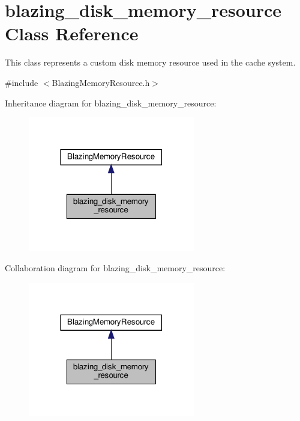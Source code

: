 \hypertarget{classblazing__disk__memory__resource}{}\section{blazing\+\_\+disk\+\_\+memory\+\_\+resource Class Reference}
\label{classblazing__disk__memory__resource}


This class represents a custom disk memory resource used in the cache system.  




{\ttfamily \#include $<$Blazing\+Memory\+Resource.\+h$>$}



Inheritance diagram for blazing\+\_\+disk\+\_\+memory\+\_\+resource\+:\nopagebreak
\begin{figure}[H]
\begin{center}
\leavevmode
\includegraphics[width=206pt]{classblazing__disk__memory__resource__inherit__graph}
\end{center}
\end{figure}


Collaboration diagram for blazing\+\_\+disk\+\_\+memory\+\_\+resource\+:\nopagebreak
\begin{figure}[H]
\begin{center}
\leavevmode
\includegraphics[width=206pt]{classblazing__disk__memory__resource__coll__graph}
\end{center}
\end{figure}
